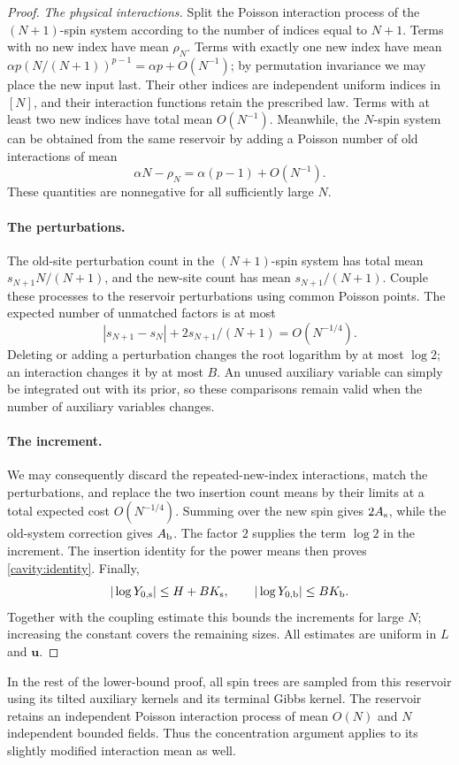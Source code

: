 \begin{proof}
\emph{The physical interactions.}
Split the Poisson interaction process of the $(N+1)$-spin system according
to the number of indices equal to $N+1$. Terms with no new index have mean
$\rho_N$. Terms with exactly one new index have mean
$\alpha p(N/(N+1))^{p-1}=\alpha p+O(N^{-1})$; by permutation invariance we
may place the new input last. Their other indices are independent uniform
indices in $[N]$, and their interaction functions retain the prescribed
law. Terms with at least two new indices have total mean $O(N^{-1})$.
Meanwhile, the $N$-spin system can be obtained from the same reservoir by
adding a Poisson number of old interactions of mean
\[
 \alpha N-\rho_N=\alpha(p-1)+O(N^{-1}).
\]
These quantities are nonnegative for all sufficiently large $N$.

\paragraph{The perturbations.}
The old-site perturbation count in the $(N+1)$-spin system has total mean
$s_{N+1}N/(N+1)$, and the new-site count has mean $s_{N+1}/(N+1)$.
Couple these processes to the reservoir perturbations using common Poisson
points. The expected number of unmatched factors is at most
\[
 |s_{N+1}-s_N|+2s_{N+1}/(N+1)=O(N^{-1/4}).
\]
Deleting or adding a perturbation changes the root logarithm by at most
$\log2$; an interaction changes it by at most $B$. An unused auxiliary
variable can simply be integrated out with its prior, so these comparisons
remain valid when the number of auxiliary variables changes.

\paragraph{The increment.}
We may consequently discard the repeated-new-index interactions, match the
perturbations, and replace the two insertion count means by their limits
at a total expected cost $O(N^{-1/4})$. Summing over the new spin gives
$2A_{\rm s}$, while the old-system correction gives $A_{\rm b}$.
The factor $2$ supplies the term $\log2$ in the increment. The insertion
identity for the power means then proves
\eqref{cavity:identity}. Finally,
\[
 |\log Y_{0,\rm s}|\le H+BK_{\rm s},\qquad
 |\log Y_{0,\rm b}|\le BK_{\rm b}.
\]
Together with the coupling estimate this bounds the increments for large
$N$; increasing the constant covers the remaining sizes. All estimates are
uniform in $L$ and $\mathbf u$.
\end{proof}

In the rest of the lower-bound proof, all spin trees are sampled from this
reservoir using its tilted auxiliary kernels and its terminal Gibbs kernel.
The reservoir retains an independent Poisson interaction process of mean
$O(N)$ and $N$ independent bounded fields. Thus the concentration argument
applies to its slightly modified interaction mean as well.
